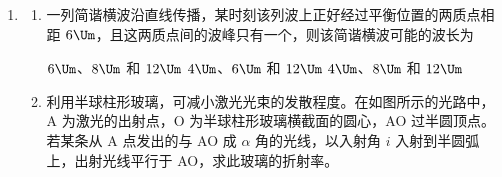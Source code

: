 \documentclass[\gkver]{gaokaozhenti}
\begin{document}
\begin{enumerate}
\begin{enumerate}
	{室内空气分子的平均动能比室外的大}
	{室内空气的密度比室外的大}
	{室内空气对室外空气做了负功}

	\item
	汽车未装载货物时，某个轮胎内气体的体积为 $V_0$，压强为 $p_0$；装载货物后，该轮胎内的压强增加了 $\Delta p$。若轮胎内气体视为理想气体，其质量、温度在装载货物前后均不变，求装载货物前后此轮胎内气体体积的变化量。
\end{enumerate}


\item
\begin{enumerate}
	\item
	一列简谐横波沿直线传播，某时刻该列波上正好经过平衡位置的两质点相距 $6\Um$，且这两质点间的波峰只有一个，则该简谐横波可能的波长为

	{$6\Um$、$8\Um$ 和 $12\Um$}
	{$4\Um$、$6\Um$ 和 $12\Um$}
	{$4\Um$、$8\Um$ 和 $12\Um$}

	\item
	利用半球柱形玻璃，可减小激光光束的发散程度。在如图所示的光路中，A 为激光的出射点，O 为半球柱形玻璃横截面的圆心，AO 过半圆顶点。若某条从 A 点发出的与 AO 成 $\alpha$ 角的光线，以入射角 $i$ 入射到半圆弧上，出射光线平行于 AO，求此玻璃的折射率。

\end{enumerate}


\end{enumerate}
\end{document}
